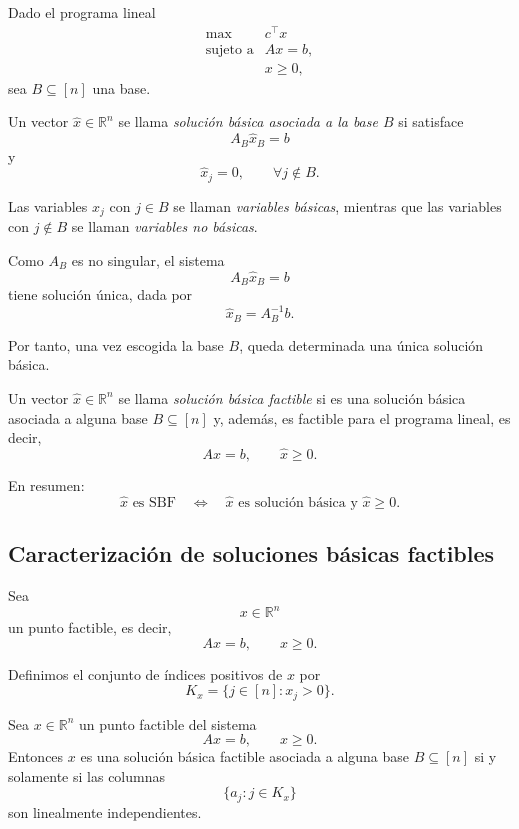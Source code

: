 \begin{definition}
Dado el programa lineal
\[
    \begin{array}{ll}
        \max & c^\top x\\[1mm]
        \text{sujeto a} & Ax=b,\\
        & x\geq 0,
    \end{array}
\]
sea \(B\subseteq[n]\) una base.

Un vector \(\widehat{x}\in\mathbb{R}^n\) se llama \emph{solución básica asociada a la base \(B\)} si satisface
\[
    A_B\widehat{x}_B=b
\]
y
\[
    \widehat{x}_j=0,
    \qquad
    \forall j\notin B.
\]

Las variables \(\widehat{x}_j\) con \(j\in B\) se llaman \emph{variables básicas}, mientras que las variables con \(j\notin B\) se llaman \emph{variables no básicas}.
\end{definition}

Como \(A_B\) es no singular, el sistema
\[
    A_B\widehat{x}_B=b
\]
tiene solución única, dada por
\[
    \widehat{x}_B=A_B^{-1}b.
\]

Por tanto, una vez escogida la base \(B\), queda determinada una única solución básica.

\begin{definition}
Un vector \(\widehat{x}\in\mathbb{R}^n\) se llama \emph{solución básica factible} si es una solución básica asociada a alguna base \(B\subseteq[n]\) y, además, es factible para el programa lineal, es decir,
\[
    A\widehat{x}=b,
    \qquad
    \widehat{x}\geq 0.
\]
\end{definition}

En resumen:
\[
    \widehat{x}
    \text{ es SBF}
    \quad \Longleftrightarrow \quad
    \widehat{x}
    \text{ es solución básica y }
    \widehat{x}\geq 0.
\]

\subsection{Caracterización de soluciones básicas factibles}

Sea
\[
    x\in\mathbb{R}^n
\]
un punto factible, es decir,
\[
    Ax=b,
    \qquad
    x\geq 0.
\]

Definimos el conjunto de índices positivos de \(x\) por
\[
    K_x
    =
    \{j\in[n]:x_j>0\}.
\]

\begin{proposition}
Sea \(x\in\mathbb{R}^n\) un punto factible del sistema
\[
    Ax=b,
    \qquad
    x\geq 0.
\]
Entonces \(x\) es una solución básica factible asociada a alguna base \(B\subseteq[n]\) si y solamente si las columnas
\[
    \{a_j:j\in K_x\}
\]
son linealmente independientes.
\end{proposition}

